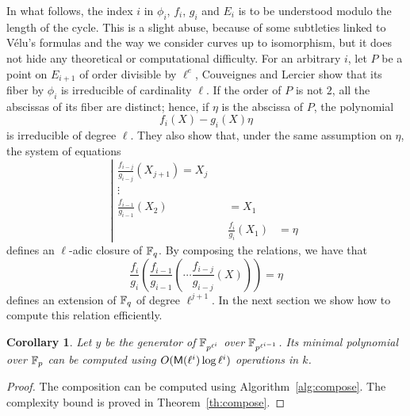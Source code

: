 \documentclass{sig-alternate}
\newtheorem{corollary}[definition]{Corollary}
\begin{document}
In what follows, the index $i$ in $\phi_i$, $f_i$, $g_i$ and $E_i$ is
to be understood modulo the length of the cycle. This is a slight
abuse, because of some subtleties linked to Vélu's formulas and the
way we consider curves up to isomorphism, but it does not hide any
theoretical or computational difficulty.  For an arbitrary $i$, let
$P$ be a point on $E_{i+1}$ of order divisible by $\ell^e$, Couveignes
and Lercier show that its fiber by $\phi_i$ is irreducible of
cardinality $\ell$. If the order of $P$ is not $2$, all the abscissas
of its fiber are distinct; hence, if $\eta$ is the abscissa of $P$,
the polynomial
\begin{equation}
  \label{eq:isog-fiber}
  f_i(X) - g_i(X)\eta
\end{equation}
is irreducible of degree $\ell$. They also show that, under the same
assumption on $\eta$, the system of equations
\begin{equation}
  \label{eq:elliptic}
  \left|
  \begin{aligned}
    \textstyle
    \frac{f_{i-j}}{g_{i-j}}(X_{j+1}) = X_j\quad\\
    \vdots\qquad\\
    \textstyle
    \frac{f_{i-1}}{g_{i-1}}(X_2) &= X_1\\
              &\textstyle\frac{f_i}{g_i}(X_1) &= \eta
  \end{aligned}
  \right.
\end{equation}
defines an $\ell$-adic closure of $\mathbb{F}_q$. By composing the relations,
we have that
\begin{equation}
  \label{eq:elliptic-uni}
  \frac{f_i}{g_i}\left(\frac{f_{i-1}}{g_{i-1}}\left(\cdots\frac{f_{i-j}}{g_{i-j}}(X)\right)\right) = \eta
\end{equation}
defines an extension of $\mathbb{F}_q$ of degree $\ell^{j+1}$. In the next
section we show how to compute this relation efficiently.

\begin{corollary}
  \sloppy
  Let $y$ be the generator of $\mathbb{F}_{p^{\ell^i}}$ over
  $\mathbb{F}_{p^{\ell^{i-1}}}$. Its minimal polynomial over $\mathbb{F}_p$ can be
  computed using $O(\mathsf{M}(\ell^i)\log\ell^i)$ operations in $k$.
\end{corollary}
\begin{proof}
  The composition can be computed using
  Algorithm~\ref{alg:compose}. The complexity bound is proved in
  Theorem~\ref{th:compose}.
\end{proof}
\end{document}
